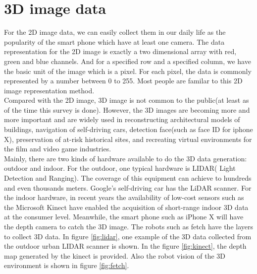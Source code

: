 \documentclass[a4paper,12pt]{article}
\begin{document}
\section{3D image data}

For the 2D image data, we can easily collect them in our daily life as the popularity of the smart phone which have at least one camera. The data representation for the 2D image is exactly a two dimensional array with red, green and blue channels. And for a specified row and a specified column, we have the basic unit of the image which is a pixel. For each pixel, the data is commonly represented by a number between 0 to 255. Most people are familar to this 2D image representation method.\\
Compared with the 2D image, 3D image is not common to the public(at least as of the time this survey is done). However, the 3D images are becoming more and more important and are widely used in reconstructing architectural models of buildings, navigation of self-driving cars, detection face(such as face ID for iphone X), preservation of at-risk historical sites, and recreating virtual environments for the film and video game industries.\\
Mainly, there are two kinds of hardware available to do the 3D data generation: outdoor and indoor. For the outdoor, one typical hardware is LIDAR( Light Detection and Ranging). The coverage of this equipment can achieve to hundreds and even thousands meters. Google’s self-driving car has the LiDAR scanner. For the  indoor hardware, in recent years the availability of low-cost sensors such as the Microsoft Kinect
have enabled the acquisition of short-range indoor 3D data at the consumer level. Meanwhile, the smart phone such as iPhone X will have the depth camera to catch the 3D image. The robots such as fetch have the layers to collect 3D data. In figure \ref{fig:lidar}, one example of the 3D data collected from the outdoor urban LIDAR scanner is shown. In the
figure \ref{fig:kinect}, the depth map generated by the kinect is provided. Also the robot vision of the 3D environment is shown in figure \ref{fig:fetch}.\\


 
 
\end{document}
